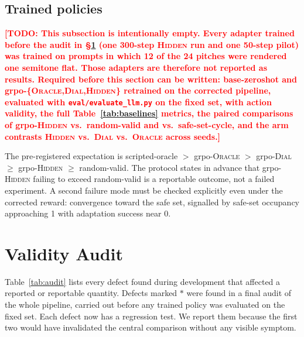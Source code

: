\documentclass[11pt]{article}
\newcommand{\todo}[1]{\textcolor{red}{\textbf{[TODO: #1]}}}
\newcommand{\hidden}{\textsc{Hidden}}
\newcommand{\dial}{\textsc{Dial}}
\newcommand{\oracle}{\textsc{Oracle}}
\begin{document}
\subsection{Trained policies}
\label{sec:trained}

\todo{This subsection is intentionally empty. Every adapter trained before the audit in \S\ref{sec:audit} (one 300-step \hidden{} run and one 50-step pilot) was trained on prompts in which 12 of the 24 pitches were rendered one semitone flat. Those adapters are therefore not reported as results. Required before this section can be written: base-zeroshot and grpo-\{\oracle,\dial,\hidden\} retrained on the corrected pipeline, evaluated with \texttt{eval/evaluate\_llm.py} on the fixed set, with action validity, the full Table~\ref{tab:baselines} metrics, the paired comparisons of grpo-\hidden{} vs.\ random-valid and vs.\ safe-set-cycle, and the arm contrasts \hidden{} vs.\ \dial{} vs.\ \oracle{} across seeds.}

The pre-registered expectation is scripted-oracle $>$ grpo-\oracle{} $>$ grpo-\dial{} $\geq$ grpo-\hidden{} $\geq$ random-valid. The protocol states in advance that grpo-\hidden{} failing to exceed random-valid is a reportable outcome, not a failed experiment. A second failure mode must be checked explicitly even under the corrected reward: convergence toward the safe set, signalled by safe-set occupancy approaching 1 with adaptation success near 0.

\section{Validity Audit}
\label{sec:audit}

Table~\ref{tab:audit} lists every defect found during development that affected a reported or reportable quantity. Defects marked $\ast$ were found in a final audit of the whole pipeline, carried out before any trained policy was evaluated on the fixed set. Each defect now has a regression test. We report them because the first two would have invalidated the central comparison without any visible symptom.
\end{document}
